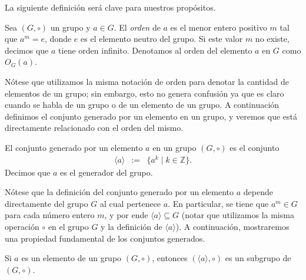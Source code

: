 

La siguiente definición será clave para nuestros propósitos.

\begin{definition}\label{def_orden}
	Sea $(G,\circ)$ un grupo y $a \in G$. El \emph{orden} de $a$ es el menor entero positivo $m$ tal que $a^m = e$, donde
        $e$ es el elemento neutro del grupo. Si este valor $m$ no existe, decimos que $a$ tiene orden infinito. Denotamos al orden del elemento $a$ en $G$ como $O_G(a)$.
\end{definition} 
Nótese que utilizamos la misma notación de orden para denotar la cantidad de elementos de un grupo; sin embargo, esto no genera confusión ya que es claro cuando se habla de un grupo o de un elemento de un grupo. 
A continuación definimos el conjunto generado por un elemento en un grupo, y veremos que está directamente relacionado con el orden del mismo. 
 
\begin{definition}\label{def_gen}
	El conjunto generado por un elemento $a$ en un grupo $(G,\circ)$ es el conjunto
        \begin{eqnarray*}
        \langle a\rangle & := & \{a^k\mid k\in\mathbb{Z}\}.
        \end{eqnarray*}
        Decimos que $a$ es el generador del grupo.
\end{definition}

Nótese que la definición del conjunto generado por un elemento $a$
depende directamente del grupo $G$ al cual pertenece $a$. En
particular, se tiene que $a^m\in G$ para cada número entero $m$, y
por ende $\langle a\rangle\subseteq G$ (notar que utilizamos la misma
operación $\circ$ en el grupo $G$ y la definición de $\langle
a \rangle$). A continuación, mostraremos una propiedad fundamental de
los conjuntos generados.


\begin{proposition}\label{prop-generado}
	Si $a$ es un elemento de un grupo $(G,\circ)$, entonces $(\langle a\rangle ,\circ)$ es un subgrupo de $(G,\circ)$. 
\end{proposition} 


